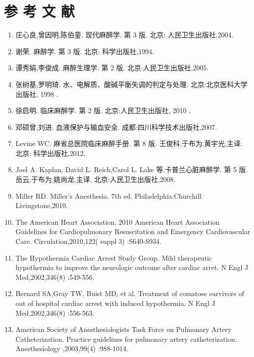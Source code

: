 \documentclass[10pt]{article}
\begin{document}
\section*{参 考 文 献}
\begin{enumerate}
  \item 庄心良,曾因明,陈伯銮. 现代麻醉学. 第 3 版. 北京: 人民卫生出版社,2004.

  \item 谢荣. 麻醉学. 第 3 版. 北京: 科学出版社,1994.

  \item 谭秀娟,李俊成. 麻醉生理学. 第 2 版. 北京:人民卫生出版社,2005.

  \item 张树基,罗明琦. 水、电解质、酸碱平衡失调的判定与处理. 北京:北京医科大学出版社, 1998 .

  \item 徐启明. 临床麻醉学. 第 2 版. 北京:人民卫生出版社, 2010 .

  \item 邓硕曾,刘进. 血液保护与输血安全. 成都:四川科学技术出版社,2007.

  \item Levine WC. 麻省总医院临床麻醉手册. 第 8 版. 王俊科,于布为,黄宇光,主译. 北京: 科学出版社,2012.

  \item Joel A. Kaplan, David L. Reich,Carol L. Lake 等.卡普兰心脏麻醉学. 第 5 版. 岳云,于布为,姚尚龙,主译. 北京:人民卫生出版社,2008.

  \item Miller RD. Miller's Anesthesia. 7th ed. Philadelphia:Churchill Livingstone,2010.

  \item The American Heart Association. 2010 American Heart Association Guidelines for Cardiopulmonary Resuscitation and Emergency Cardiovascular Care. Circulation,2010,122( suppl 3) :S640-S934.

  \item The Hypothermia Cardiac Arrest Study Group. Mild therapeutic hypothermia to improve the neurologic outcome after cardiac arret. N Engl J Med,2002,346(8) :549-556.

  \item Bernard SA,Gray TW, Buist MD, et al. Treatment of comatose survivors of out of hospital cardiac arrest with induced hypothermia. N Engl J Med,2002,346(8) :556-563.

  \item American Society of Anesthesiologists Task Force on Pulmonary Artery Catheterization. Practice guidelines for pulmonary artery catheterization. Anesthesiology ,2003,99(4) :988-1014.


\end{enumerate}
\end{document}
